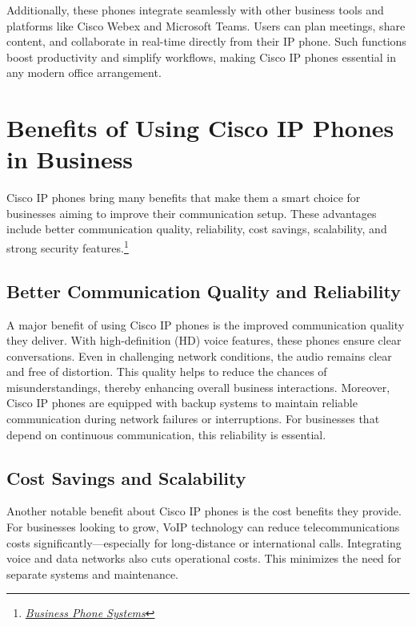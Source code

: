 \documentclass[11pt,a4paper]{article}
\begin{document}
Additionally, these phones integrate seamlessly with other business tools and platforms like Cisco Webex and Microsoft Teams. Users can plan meetings, share content, and collaborate in real-time directly from their IP phone. Such functions boost productivity and simplify workflows, making Cisco IP phones essential in any modern office arrangement.


\section*{Benefits of Using Cisco IP Phones in Business}

Cisco IP phones bring many benefits that make them a smart choice for businesses aiming to improve their communication setup. These advantages include better communication quality, reliability, cost savings, scalability, and strong security features.\footnote{\href{https://www.cisco.com/c/en/us/solutions/small-business/collaboration/phone-systems.html}{\textit{Business Phone Systems}}}

\subsection*{Better Communication Quality and Reliability}

A major benefit of using Cisco IP phones is the improved communication quality they deliver. With high-definition (HD) voice features, these phones ensure clear conversations. Even in challenging network conditions, the audio remains clear and free of distortion. This quality helps to reduce the chances of misunderstandings, thereby enhancing overall business interactions. Moreover, Cisco IP phones are equipped with backup systems to maintain reliable communication during network failures or interruptions. For businesses that depend on continuous communication, this reliability is essential.

\subsection*{Cost Savings and Scalability}


Another notable benefit about Cisco IP phones is the cost benefits they provide. For businesses looking to grow, VoIP technology can reduce telecommunications costs significantly—especially for long-distance or international calls. Integrating voice and data networks also cuts operational costs. This minimizes the need for separate systems and maintenance.
\end{document}
